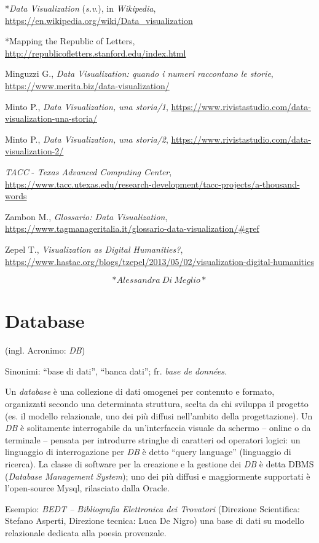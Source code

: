 \documentclass[
  b5paper,
  twoside,
  12pt,
  chapterprefix=false,
  bibliography=totocnumbered,
  parskip=false]{scrbook}
\begin{document}
*\emph{Data Visualization} (\emph{s.v}.), in \emph{Wikipedia},
\url{https://en.wikipedia.org/wiki/Data_visualization}

*Mapping the Republic of Letters,
\url{http://republicofletters.stanford.edu/index.html}

Minguzzi G., \emph{Data Visualization: quando i numeri raccontano le storie},
\url{https://www.merita.biz/data-visualization/}

Minto P., \emph{Data Visualization, una storia/1},
\url{https://www.rivistastudio.com/data-visualization-una-storia/}

Minto P., \emph{Data Visualization, una storia/2},
\url{https://www.rivistastudio.com/data-visualization-2/}

\emph{TACC} - \emph{Texas Advanced Computing Center},
\url{https://www.tacc.utexas.edu/research-development/tacc-projects/a-thousand-words}

Zambon M., \emph{Glossario: Data Visualization},
\url{https://www.tagmanageritalia.it/glossario-data-visualization/\#gref}

Zepel T., \emph{Visualization as Digital Humanities?},
\url{https://www.hastac.org/blogs/tzepel/2013/05/02/visualization-digital-humanities}

\[*Alessandra~Di~Meglio*\]

\hypertarget{database}{%
\chapter{Database}\label{database}}

(ingl. Acronimo: \emph{DB})

Sinonimi: \enquote{base di dati}, \enquote{banca dati}; fr. \emph{base de données.}

Un \emph{database} è una collezione di dati omogenei per contenuto e formato,
organizzati secondo una determinata struttura, scelta da chi sviluppa il
progetto (es. il modello relazionale, uno dei più diffusi nell'ambito
della progettazione). Un \emph{DB} è solitamente interrogabile da
un'interfaccia visuale da schermo -- online o da terminale -- pensata
per introdurre stringhe di caratteri od operatori logici: un linguaggio
di interrogazione per \emph{DB} è detto \enquote{query language} (linguaggio di
ricerca). La classe di software per la creazione e la gestione dei \emph{DB}
è detta DBMS (\emph{Database Management System}); uno dei più diffusi e
maggiormente supportati è l'open-source Mysql, rilasciato dalla Oracle.

Esempio: \emph{BEDT -- Bibliografia Elettronica dei Trovatori} (Direzione
Scientifica: Stefano Asperti, Direzione tecnica: Luca De Nigro) una base
di dati su modello relazionale dedicata alla poesia provenzale.
\end{document}
